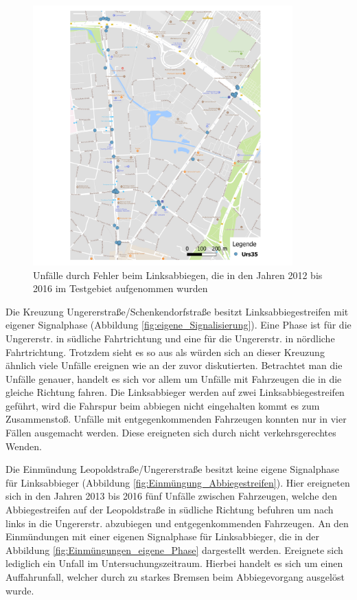 \begin{savenotes}
	\begin{figure}[H]
		\centering
		\includegraphics[width=10cm,height=10cm]{figures/map_Urs35}
		\caption[Unfälle durch Fehler beim Linksabbiegen, die in den Jahren 2012 bis 2016 im Testgebiet aufgenommen wurden]{Unfälle durch Fehler beim Linksabbiegen, die in den Jahren 2012 bis 2016 im Testgebiet aufgenommen wurden}\label{fig:map_Urs35}
	\end{figure}
\end{savenotes}

Die Kreuzung Ungererstraße/Schenkendorfstraße besitzt Linksabbiegestreifen mit eigener Signalphase (Abbildung  \ref{fig:eigene_Signalisierung}). Eine Phase ist für die Ungererstr. in südliche Fahrtrichtung und eine für die Ungererstr. in nördliche Fahrtrichtung. Trotzdem sieht es so aus als würden sich an dieser Kreuzung ähnlich viele Unfälle ereignen wie an der zuvor diskutierten. Betrachtet man die Unfälle genauer, handelt es sich vor allem um Unfälle mit Fahrzeugen die in die gleiche Richtung fahren. Die Linksabbieger werden auf zwei Linksabbiegestreifen geführt, wird die Fahrspur beim abbiegen nicht eingehalten kommt es zum Zusammenstoß. Unfälle mit entgegenkommenden Fahrzeugen konnten nur in vier Fällen ausgemacht werden. Diese ereigneten sich durch nicht verkehrsgerechtes Wenden.

Die Einmündung Leopoldstraße/Ungererstraße besitzt keine eigene Signalphase für Linksabbieger (Abbildung \ref{fig:Einmüngung_Abbiegestreifen}). Hier ereigneten sich in den Jahren 2013 bis 2016 fünf Unfälle zwischen Fahrzeugen, welche den Abbiegestreifen auf der Leopoldstraße in südliche Richtung befuhren um nach links in die Ungererstr. abzubiegen und entgegenkommenden Fahrzeugen. An den Einmündungen mit einer eigenen Signalphase für Linksabbieger, die in der Abbildung \ref{fig:Einmüngungen_eigene_Phase} dargestellt werden. Ereignete sich lediglich ein Unfall im Untersuchungszeitraum. Hierbei handelt es sich um einen Auffahrunfall, welcher durch zu starkes Bremsen beim Abbiegevorgang ausgelöst wurde.

